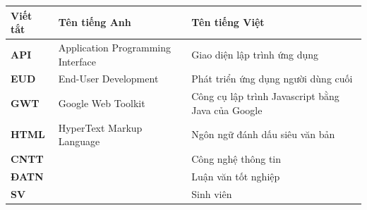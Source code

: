 \documentclass[../DoAn.tex]{subfiles}
\begin{document}
\begin{longtable}{l p{6cm} p{7cm}}
	\hline
   \textbf{Viết tắt}  & \textbf{Tên tiếng Anh}	& \textbf{Tên tiếng Việt} \\ \hline 
	\textbf{API} & Application Programming Interface & Giao diện lập trình ứng dụng\\
	\textbf{EUD} & End-User Development & Phát triển ứng dụng người dùng cuối\\
	\textbf{GWT} & Google Web Toolkit & Công cụ lập trình Javascript bằng Java của Google\\
	\textbf{HTML} & HyperText Markup Language & Ngôn ngữ đánh dấu siêu văn bản\\
	\textbf{CNTT }  &   & Công nghệ thông tin\\
	\textbf{ĐATN} &  & Luận văn tốt nghiệp \\
	\textbf{SV} &  & Sinh viên \\

    \hline
\end{longtable}
\end{document}
